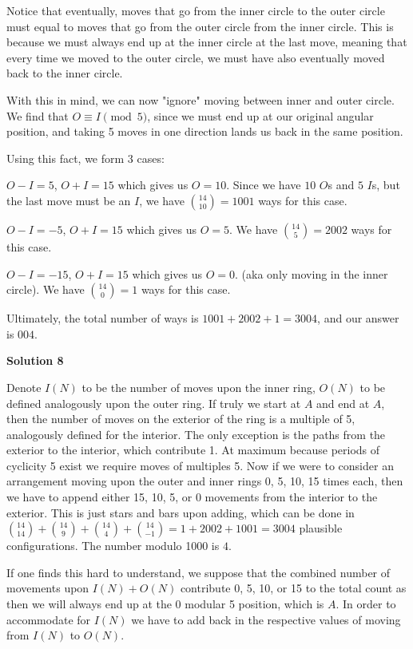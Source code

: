 \begin{enumerate}
 
Notice that eventually, moves that go from the inner circle to the outer circle must equal to moves that go from the outer circle from the inner circle. This is because we must always end up at the inner circle at the last move, meaning that every time we moved to the outer circle, we must have also eventually moved back to the inner circle. 

 
With this in mind, we can now "ignore" moving between inner and outer circle. We find that $O \equiv I \pmod 5$, since we must end up at our original angular position, and taking 5 moves in one direction lands us back in the same position.

 
Using this fact, we form $3$ cases:

 
$O - I = 5$, $O + I = 15$   which gives us $O = 10$. Since we have $10$ $O$s and $5$ $I$s, but the last move must be an $I$, we have $\binom{14}{10}=1001$ ways for this case.

 $O - I = -5$, $O + I = 15$   which gives us $O = 5$. We have $\binom{14}{5}=2002$ ways for this case.

 $O - I = -15$, $O + I = 15$   which gives us $O = 0$. (aka only moving in the inner circle). We have $\binom{14}{0}=1$ ways for this case.

 
Ultimately, the total number of ways is $1001 + 2002 + 1 = 3004$, and our answer is $\boxed{004}$.

 



\textbf{Solution 8}

Denote $I(N)$ to be the number of moves upon the inner ring, $O(N)$ to be defined analogously upon the outer ring. If truly we start at $A$ and end at $A$, then the number of moves on the exterior of the ring is a multiple of 5, analogously defined for the interior. The only exception is the paths from the exterior to the interior, which contribute 1. At maximum because periods of cyclicity 5 exist we require moves of multiples 5. Now if we were to consider an arrangement moving upon the outer and inner rings 0, 5, 10, 15 times each, then we have to append either 15, 10, 5, or 0 movements from the interior to the exterior. This is just stars and bars upon adding, which can be done in $\binom{14}{14} + \binom{14}{9} + \binom{14}{4} + \binom{14}{-1} = 1 + 2002 + 1001 = 3004$ plausible configurations. The number modulo 1000 is $\boxed{4}$.

 If one finds this hard to understand, we suppose that the combined number of movements upon $I(N) + O(N)$ contribute 0, 5, 10, or 15 to the total count as then we will always end up at the 0 modular 5 position, which is $A$. In order to accommodate for $I(N)$ we have to add back in the respective values of moving from $I(N)$ to $O(N)$. 


\end{enumerate}
